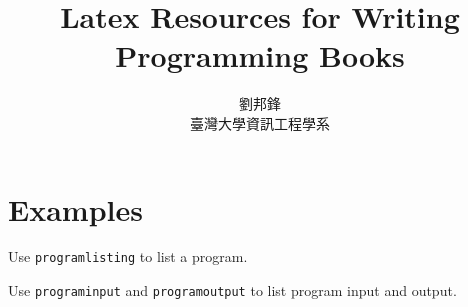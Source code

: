 \documentclass[11pt,twoside]{book}
\begin{document}
\begin{CJK}{UTF8}{bsmi}
  
\title{Latex Resources for Writing Programming Books}
\author{劉邦鋒 \\ 臺灣大學資訊工程學系}

\begin{titlepage}
\maketitle
\end{titlepage}

\chapter{Examples}

Use {\tt programlisting} to list a program.


Use {\tt programinput} and {\tt programoutput} to list program input
  and output.


\end{CJK}
\end{document}
